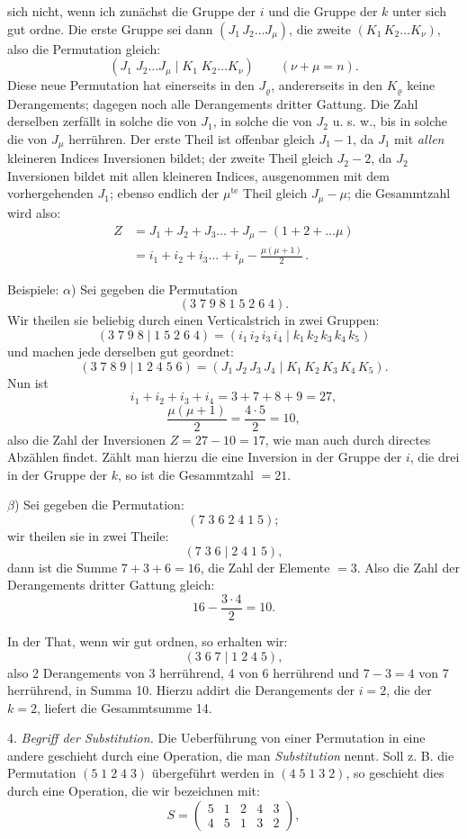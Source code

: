 \documentclass[11pt]{article}
\begin{document}
sich nicht, wenn ich zunächst die Gruppe der $i$ und die Gruppe der $k$ unter sich gut ordne. Die erste Gruppe sei dann $(J_1\,J_2\dots J_\mu)$, die zweite $(K_1\,K_2\dots K_\nu)$, also die Permutation gleich:
\[
(J_1\;J_2\dots J_\mu \mid K_1\;K_2\dots K_\nu) \qquad (\nu+\mu=n).
\]
Diese neue Permutation hat einerseits in den $J_\varrho$, andererseits in den $K_\varrho$ keine Derangements; dagegen noch alle Derangements dritter Gattung. Die Zahl derselben zerfällt in solche die von $J_1$, in solche die von $J_2$ u. s. w., bis in solche die von $J_\mu$ herrühren. Der erste Theil ist offenbar gleich $J_1-1$, da $J_1$ mit \textit{allen} kleineren Indices Inversionen bildet; der zweite Theil gleich $J_2-2$, da $J_2$ Inversionen bildet mit allen kleineren Indices, ausgenommen mit dem vorhergehenden $J_1$; ebenso endlich der $\mu^{\text{te}}$ Theil gleich $J_\mu - \mu$; die Gesammtzahl wird also:
\[
\begin{aligned}
Z &= J_1+J_2+J_3\dots+J_\mu-(1+2+\dots \mu)\\
  &= i_1+i_2+i_3\dots+i_\mu-\frac{\mu(\mu+1)}{2}\,.
\end{aligned}
\]

Beispiele: $\alpha$) Sei gegeben die Permutation
\[
(3\;7\;9\;8\;1\;5\;2\;6\;4).
\]
Wir theilen sie beliebig durch einen Verticalstrich in zwei Gruppen:
\[
(3\;7\;9\;8 \mid 1\;5\;2\;6\;4) = (i_1\,i_2\,i_3\,i_4 \mid k_1\,k_2\,k_3\,k_4\,k_5)
\]
und machen jede derselben gut geordnet:
\[
(3\;7\;8\;9 \mid 1\;2\;4\;5\;6) = (J_1\,J_2\,J_3\,J_4 \mid K_1\,K_2\,K_3\,K_4\,K_5).
\]
Nun ist
\[
i_1+i_2+i_3+i_4 = 3+7+8+9 = 27,
\]
\[
\frac{\mu(\mu+1)}{2} = \frac{4 \cdot 5}{2} = 10,
\]
also die Zahl der Inversionen $Z = 27-10=17$, wie man auch durch directes Abzählen findet. Zählt man hierzu die eine Inversion in der Gruppe der $i$, die drei in der Gruppe der $k$, so ist die Gesammtzahl $= 21$.

$\beta$) Sei gegeben die Permutation:
\[
(7\;3\;6\;2\;4\;1\;5);
\]
wir theilen sie in zwei Theile:
\[
(7\;3\;6 \mid 2\;4\;1\;5),
\]
dann ist die Summe $7+3+6=16$, die Zahl der Elemente $=3$. Also die Zahl der Derangements dritter Gattung gleich:
\[
16 - \frac{3 \cdot 4}{2} = 10.
\]

In der That, wenn wir gut ordnen, so erhalten wir:
\[
(3\;6\;7 \mid 1\;2\;4\;5),
\]
also 2 Derangements von 3 herrührend, 4 von 6 herrührend und $7-3=4$ von 7 herrührend, in Summa 10. Hierzu addirt die Derangements der $i=2$, die der $k=2$, liefert die Gesammtsumme 14.

4. \textit{Begriff der Substitution.} Die Ueberführung von einer Permutation in eine andere geschieht durch eine Operation, die man \textit{Substitution} nennt. Soll z. B. die Permutation $(5\;1\;2\;4\;3)$ übergeführt werden in $(4\;5\;1\;3\;2)$, so geschieht dies durch eine Operation, die wir bezeichnen mit:
\[
S = \begin{pmatrix} 5 & 1 & 2 & 4 & 3\\ 4 & 5 & 1 & 3 & 2 \end{pmatrix},
\]
\end{document}
